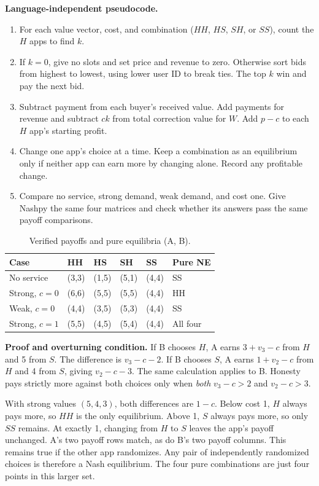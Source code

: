 \noindent\textbf{Language-independent pseudocode.}
\begin{enumerate}[label=\arabic*.,leftmargin=*]
\item For each value vector, cost, and combination ($HH$, $HS$, $SH$, or $SS$), count the $H$ apps to find $k$.
\item If $k=0$, give no slots and set price and revenue to zero. Otherwise sort bids from highest to lowest, using lower user ID to break ties. The top $k$ win and pay the next bid.
\item Subtract payment from each buyer's received value. Add payments for revenue and subtract $ck$ from total correction value for $W$. Add $p-c$ to each $H$ app's starting profit.
\item Change one app's choice at a time. Keep a combination as an equilibrium only if neither app can earn more by changing alone. Record any profitable change.
\item Compare no service, strong demand, weak demand, and cost one. Give Nashpy the same four matrices and check whether its answers pass the same payoff comparisons.
\end{enumerate}

\begin{table}[h]\centering
\caption{Verified payoffs and pure equilibria (A, B).}
\fontsize{9.1pt}{10.6pt}\selectfont\setlength{\tabcolsep}{2pt}
\begin{tabularx}{\columnwidth}{@{}YYYYYY@{}}\toprule
\textbf{Case} & \textbf{HH} & \textbf{HS} & \textbf{SH} & \textbf{SS} & \textbf{Pure NE}\\\midrule
No service & (3,3) & (1,5) & (5,1) & (4,4) & SS\\
Strong, $c=0$ & (6,6) & (5,5) & (5,5) & (4,4) & HH\\
Weak, $c=0$ & (4,4) & (3,5) & (5,3) & (4,4) & SS\\
Strong, $c=1$ & (5,5) & (4,5) & (5,4) & (4,4) & All four\\
\bottomrule\end{tabularx}\end{table}

\noindent\textbf{Proof and overturning condition.}
If B chooses $H$, A earns $3+v_3-c$ from $H$ and 5 from $S$. The difference is $v_3-c-2$. If B chooses $S$, A earns $1+v_2-c$ from $H$ and 4 from $S$, giving $v_2-c-3$. The same calculation applies to B. Honesty pays strictly more against both choices only when \emph{both} $v_3-c>2$ and $v_2-c>3$.

With strong values $(5,4,3)$, both differences are $1-c$. Below cost 1, $H$ always pays more, so $HH$ is the only equilibrium. Above 1, $S$ always pays more, so only $SS$ remains. At exactly 1, changing from $H$ to $S$ leaves the app's payoff unchanged. A's two payoff rows match, as do B's two payoff columns. This remains true if the other app randomizes. Any pair of independently randomized choices is therefore a Nash equilibrium. The four pure combinations are just four points in this larger set.

